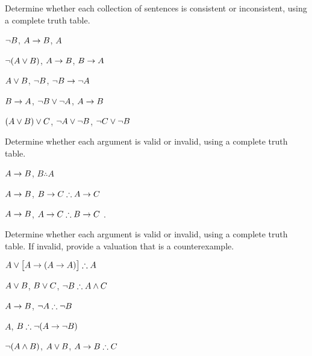 \begin{practiceproblems}
\problempart
\label{pr.TT.satisfiable2}

\noindent\problempart
\label{pr.TT.satisfiable3}
Determine whether each collection of sentences is consistent or inconsistent, using a complete truth table.
\begin{earg}
\item $\neg B$, $A \rightarrow B$, $A$ \vspace{.5ex} \hfill {}
\item $\neg(A \vee B)$, $A \rightarrow B$, $B \rightarrow A$\vspace{.5ex} \hfill {}
\item $A \vee B$, $\neg B$, $\neg B \rightarrow \neg A$\vspace{.5ex} \hfill {}
\item $B \rightarrow A$, $\neg B \vee \neg A$, $A \rightarrow B$\vspace{.5ex} \hfill {}
\item $(A \vee B) \vee C$, $\neg A \vee \neg B$, $\neg C \vee \neg B$\vspace{.5ex} \hfill {}
\end{earg}

\noindent\problempart
\label{pr.TT.valid2}
Determine whether each argument is valid or invalid, using a complete truth table.
\begin{earg}
\item $A\rightarrow B$, $B \therefore  A$ \hfill {}

\item $A\rightarrow B$, $B\eif C \therefore A\eif C$ \hfill {}

\item $A \rightarrow B$, $A \eif C\therefore B \eif C$ \hfill {}.

\end{earg}

\noindent\problempart
\label{pr.TT.valid3}
Determine whether each argument is valid or invalid, using a complete truth table. If invalid, provide a valuation that is a counterexample.
\begin{earg}
\item $A\eor\bigl[A\eif(A\eif A)\bigr] \therefore  A $\vspace{.5ex} \hfill {}
\item $A\vee B$, $B\vee C$, $\enot B \therefore A \eand C$\vspace{.5ex} \hfill {}
\item $A \rightarrow B$, $\enot A\therefore \enot B$ \vspace{.5ex} \hfill {}
\item $A$, $B\therefore \enot(A\eif \enot B)$ \vspace{.5ex} \hfill {}
\item $\neg(A \mathbin{\wedge} B)$, $A \vee B$, $A \eif B\therefore C$ \vspace{.5ex} \hfill {}
\end{earg}


\end{practiceproblems}
